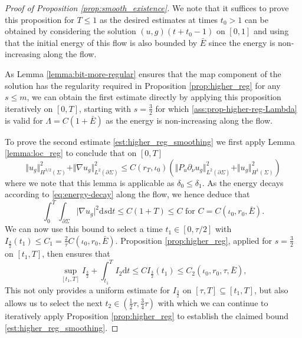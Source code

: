 \documentclass[10pt,reqno]{amsart}
\theoremstyle{plain}
\theoremstyle{definition}
\numberwithin{equation}{section}
\newcommand{\de}{\delta}
\newcommand{\La}{\Lambda}
\newcommand{\Si}{\Sigma}
\newcommand{\norm}[1]{\Vert#1\Vert}
\newcommand{\beq}{\begin{equation}}
\newcommand{\eeq}{\end{equation}}
\newcommand{\dd}{\mathrm{d}} %
\newcommand{\abs}[1]{\vert#1\vert}
\newcommand{\na}{\nabla}
\newcommand{\pSi}{{\partial \Sigma}}
\newcommand{\hf}{\frac{1}{2}} %
\newcommand{\p}{\partial} %
\newcommand{\subs}{\subseteq} %
\begin{document}
\begin{proof}[Proof of Proposition \ref{prop:smooth_existence}]
    We note that it suffices to prove this proposition for $T\leq 1$ as the desired estimates at times $t_0>1 $ can be obtained by considering the solution $(u,g)(t+t_0-1)$ on $[0,1]$ and using that the initial energy of this flow is also bounded by $\bar E$ since the energy is non-increasing along the flow.

    As Lemma \ref{lemma:bit-more-regular} ensures that the map component of the solution has the regularity required in Proposition \ref{prop:higher_reg} for any $s\leq m$, we can obtain the first estimate directly by applying this proposition iteratively on $[0,T]$, starting with $s=\frac32$ for which  \eqref{ass:prop-higher-reg-Lambda} is valid for $\La=C(1+\bar{E})$ as the energy is non-increasing along the flow.

    To prove the second estimate \eqref{est:higher_reg_smoothing} we first apply Lemma \ref{lemma:loc_reg} to conclude that on $[0,T]$ 
    \begin{equation*}
    	\norm{u_g}_{H^{3/2}(\Si)}^2+	\norm{\nabla u_g}_{L^2(\p\Si)}^2 \leq C(r_T,\iota_0) \left(\norm{P_u \p_\nu u_g}_{L^2(\p\Si)}^2 + \norm{u_g}_{H^1(\Si)}^2\right) %
    \end{equation*} 
    where we note that this lemma is applicable as $\de_0\leq \de_1$. 
    As the energy decays according to \eqref{eq:energy-decay}  along the flow, we  hence deduce that 
    \beq\label{est:int-I3/2}
        \int_{0}^{T}\int_{\p\Si}\abs{\na u_g}^2 \dd s \dd t \leq C (1+T)\leq C \text{ for } C=C(\iota_0, r_0,\bar E).
    \eeq
    We can now use this bound to select a time $t_1\in [0,\tau/2]$ with  $I_{\frac{3}{2}}(t_1)\leq C_1=\frac{2}{\tau} C(\iota_0,r_0,\bar E).$ Proposition \ref{prop:higher_reg}, applied for $s = \frac{3}{2}$ on $[t_1,T]$, then ensures that
	$$\sup\limits_{[t_1,T]} I_\frac{3}{2} + \int_{t_1}^T I_{2} \dd t \leq C I_{\frac{3}{2}}(t_1) \leq C_2(\iota_0,r_0,\tau,\bar E),$$
    This not only provides a uniform estimate for $I_\frac{3}{2}$ on  $[\tau,T] \subs [t_1,T]$, but also allows us to select the next $t_2\in (\hf \tau,\frac{3}{4}\tau)$ with which we can continue to iteratively apply Proposition \ref{prop:higher_reg} to establish the claimed bound \eqref{est:higher_reg_smoothing}. %
\end{proof}
\end{document}
